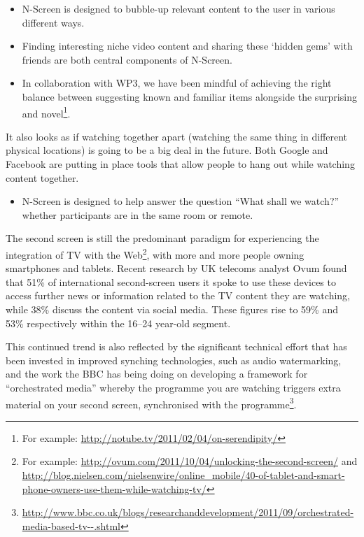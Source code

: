 \documentclass{notube}
\begin{document}
\begin{itemize}
\item{N-Screen is designed to bubble-up relevant content to the user in various different ways.}
\item{Finding interesting niche video content and sharing these `hidden gems’ with friends are both central components of N-Screen.}
\item{In collaboration with WP3, we have been mindful of achieving the right balance between suggesting known and familiar items alongside the surprising and novel\footnote{For example: \url{http://notube.tv/2011/02/04/on-serendipity/}}.}
\end{itemize}

It also looks as if watching together apart (watching the same thing in different physical locations) is going to be a big deal in the future. Both Google and Facebook are putting in place tools that allow people to hang out while watching content together.

\begin{itemize}
\item{N-Screen is designed to help answer the question ``What shall we watch?” whether participants are in the same room or remote.}
\end{itemize}

The second screen is still the predominant paradigm for experiencing the integration of TV with the Web\footnote{For example: \url{http://ovum.com/2011/10/04/unlocking-the-second-screen/} and \url{http://blog.nielsen.com/nielsenwire/online_mobile/40-of-tablet-and-smart-phone-owners-use-them-while-watching-tv/}}, with more and more people owning smartphones and tablets. Recent research by UK telecoms analyst Ovum found that 51\% of international second-screen users it spoke to use these devices to access further news or information related to the TV content they are watching, while 38\% discuss the content via social media. These figures rise to 59\% and 53\% respectively within the 16–24 year-old segment.

This continued trend is also reflected by the significant technical effort that has been invested in improved synching technologies, such as audio watermarking, and the work the BBC has being doing on developing a framework for ``orchestrated media” whereby the programme you are watching triggers extra material on your second screen, synchronised with the programme\footnote{\url{http://www.bbc.co.uk/blogs/researchanddevelopment/2011/09/orchestrated-media-based-tv--.shtml}}. 
\end{document}
